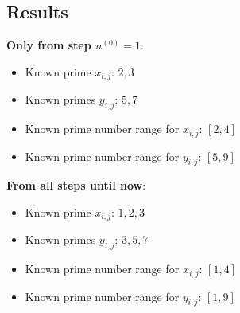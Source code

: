 \subsection{Results}
\label{ss:resultsstepn0_1}
\textbf{Only from step $n^{\left(0\right)} = 1$}:
\begin{itemize}
	\item Known prime $x_{i,j}$: $2,3$
	\item Known primes $y_{i,j}$: $5,7$
	\item Known prime number range for $x_{i,j}$: $[2,4]$
	\item Known prime number range for $y_{i,j}$: $[5,9]$
\end{itemize}

\textbf{From all steps until now}:
\begin{itemize}
	\item Known prime $x_{i,j}$: $1,2,3$
	\item Known primes $y_{i,j}$: $3,5,7$
	\item Known prime number range for $x_{i,j}$: $[1,4]$
	\item Known prime number range for $y_{i,j}$: $[1,9]$
\end{itemize}






